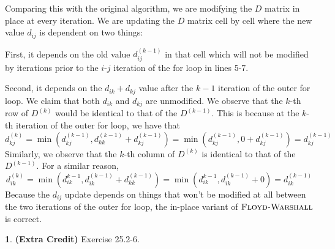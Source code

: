 \documentclass[11pt]{article}
\theoremstyle{definition}
\theoremstyle{theorem}
\newtheorem{prob}{}
\newcommand{\solution}{\medskip\noindent{\color{DarkBlue}\textbf{Solution:}}}
\begin{document}
\solution

Comparing this with the original algorithm, we are modifying the $D$ matrix in place at every iteration. We are updating the $D$ matrix cell by cell where the new value $d_{ij}$ is dependent on two things:

First, it depends on the old value $d_{ij}^{(k-1)}$ in that cell which will not be modified by iterations prior to the $i$-$j$ iteration of the for loop in lines 5-7. 

Second, it depends on the $d_{ik} + d_{kj}$ value after the $k-1$ iteration of the outer for loop. We claim that both $d_{ik}$ and $d_{kj}$ are unmodified. We observe that the $k$-th row of $D^{(k)}$ would be identical to that of the $D^{(k-1)}$. This is because at the $k$-th iteration of the outer for loop, we have that 
\[
d_{kj}^{(k)} = \min(d_{kj}^{(k-1)}, d_{kk}^{(k-1)} + d_{kj}^{(k-1)}) = \min(d_{kj}^{(k-1)}, 0 + d_{kj}^{(k-1)}) = d_{kj}^{(k-1)}
\]
Similarly, we observe that the $k$-th column of $D^{(k)}$ is identical to that of the $D^{(k-1)}$. For a similar reason,
\[
d_{ik}^{(k)} = \min(d_{ik}^{k-1}, d_{ik}^{(k-1)} + d_{kk}^{(k-1)}) = \min(d_{ik}^{k-1}, d_{ik}^{(k-1)} + 0) = d_{ik}^{(k-1)}
\]
Because the $d_{ij}$ update depends on things that won't be modified at all between the two iterations of the outer for loop, the in-place variant of $\textproc{\textsc{Floyd-Warshall}}$ is correct.

\newpage
\begin{prob} \textbf{(Extra Credit)} Exercise 25.2-6.
\end{prob}
\solution
\end{document}
